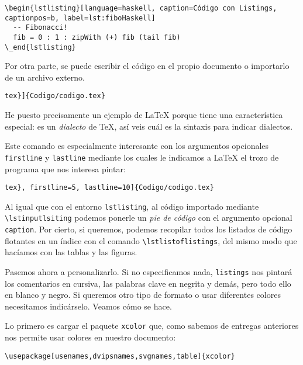 \begin{lstlisting}[language={[latex]tex}]
% Código con pie en la parte inferior (por defecto en la superior) y etiqueta
\begin{lstlisting}[language=haskell, caption=Código con Listings, captionpos=b, label=lst:fiboHaskell]
  -- Fibonacci!
  fib = 0 : 1 : zipWith (+) fib (tail fib)
\_end{lstlisting}
\end{lstlisting}

Por otra parte, se puede escribir el código en el propio documento o
importarlo de un archivo externo.

\begin{lstlisting}[language={[latex]tex}]
tex}]{Codigo/codigo.tex}
\end{lstlisting}

He puesto precisamente un ejemplo de LaTeX porque tiene una
característica especial: es un \emph{dialecto} de TeX, así veis cuál es
la sintaxis para indicar dialectos.

Este comando es especialmente interesante con los argumentos opcionales
\lstinline!firstline! y \lstinline!lastline! mediante los cuales le
indicamos a LaTeX el trozo de programa que nos interesa pintar:

\begin{lstlisting}[language={[latex]tex}]
tex}, firstline=5, lastline=10]{Codigo/codigo.tex}
\end{lstlisting}

Al igual que con el entorno \lstinline!lstlisting!, al código importado
mediante \lstinline!\lstinputlsiting! podemos ponerle un \emph{pie de
código} con el argumento opcional \lstinline!caption!. Por cierto, si
queremos, podemos recopilar todos los listados de código flotantes en un
índice con el comando \lstinline!\lstlistoflistings!, del mismo modo que
hacíamos con las tablas y las figuras.

Pasemos ahora a personalizarlo. Si no especificamos nada,
\lstinline!listings! nos pintará los comentarios en cursiva, las
palabras clave en negrita y demás, pero todo ello en blanco y negro. Si
queremos otro tipo de formato o usar diferentes colores necesitamos
indicárselo. Veamos cómo se hace.

Lo primero es cargar el paquete \lstinline!xcolor! que, como sabemos de
entregas anteriores nos permite usar colores en nuestro documento:

\begin{lstlisting}[language={[latex]tex}]
\usepackage[usenames,dvipsnames,svgnames,table]{xcolor}
\end{lstlisting}

